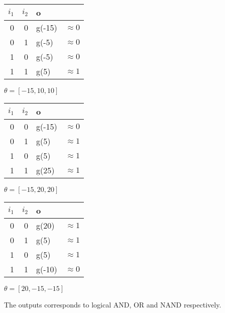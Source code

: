 \documentclass{report}
\begin{document}
\begin{minipage}[c]{0.333\textwidth}
\begin{tabular}{rrlc}
\hline
  $i_1$  &  $i_2$ &  o \\ \hline
    0    &    0   &  g(-15) &  $\approx 0$ \\
    0    &    1   &  g(-5)  &  $\approx 0$ \\
    1    &    0   &  g(-5)  &  $\approx 0$ \\ 
    1    &    1   &  g(5)   &  $\approx 1$ \\ \hline
\end{tabular}
\begin{flushleft}
$\theta=[-15, 10, 10 ]$ 
\end{flushleft}
\end{minipage}
\begin{minipage}[c]{0.333\textwidth}
\begin{tabular}{rrlc}
\hline
  $i_1$  &  $i_2$ &  o \\ \hline
    0    &    0   &  g(-15) &  $\approx 0$ \\
    0    &    1   &  g(5)  &  $\approx 1$ \\
    1    &    0   &  g(5)  &  $\approx 1$ \\ 
    1    &    1   &  g(25)   &  $\approx 1$ \\ \hline
\end{tabular}
\begin{flushleft}
$\theta=[-15, 20, 20 ]$ 
\end{flushleft}
\end{minipage}
\begin{minipage}[c]{0.333\textwidth}
\begin{tabular}{rrlc}
\hline
  $i_1$  &  $i_2$ &  o \\ \hline
    0    &    0   &  g(20) &  $\approx 1$ \\
    0    &    1   &  g(5)  &  $\approx 1$ \\
    1    &    0   &  g(5)  &  $\approx 1$ \\ 
    1    &    1   &  g(-10)   &  $\approx 0$ \\ \hline
\end{tabular}
\begin{flushleft}
$\theta=[20, -15, -15]$
\end{flushleft}
\end{minipage}

\vspace{0.5cm}
The outputs corresponds to logical AND, OR and NAND respectively.
\end{document}

